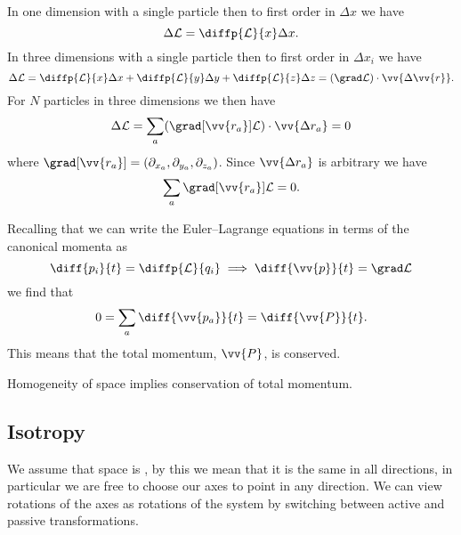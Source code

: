 \documentclass[fleqn]{NotesClass}
\newcommand*{\lagrangian}{\mathcal{L}}
\begin{document}
    In one dimension with a single particle then to first order in \(\Delta x\) we have
    \begin{equation}
        \Delta\lagrangian = \diffp{\lagrangian}{x} \Delta x.
    \end{equation}
    In three dimensions with a single particle then to first order in \(\Delta x_i\) we have
    \begin{equation}
        \Delta\lagrangian = \diffp{\lagrangian}{x} \Delta x + \diffp{\lagrangian}{y} \Delta y + \diffp{\lagrangian}{z} \Delta z = (\grad \lagrangian) \cdot \vv{\Delta\vv{r}}.
    \end{equation}
    For \(N\) particles in three dimensions we then have
    \begin{equation}
        \Delta\lagrangian = \sum_a (\grad[\vv{r_a}] \lagrangian) \cdot \vv{\Delta r_a} = 0
    \end{equation}
    where \(\grad[\vv{r_a}] = (\partial_{x_a}, \partial_{y_a}, \partial_{z_a})\).
    Since \(\vv{\Delta r_a}\) is arbitrary we have
    \begin{equation}
        \sum_a \grad[\vv{r_a}]\lagrangian = 0.
    \end{equation}
    
    Recalling that we can write the Euler--Lagrange equations in terms of the canonical momenta as
    \begin{equation}
        \diff{p_i}{t} = \diffp{\lagrangian}{q_i} \implies \diff{\vv{p}}{t} = \grad \lagrangian
    \end{equation}
    we find that
    \begin{equation}
        0 = \sum_{a} \diff{\vv{p_a}}{t} = \diff{\vv{P}}{t}.
    \end{equation}
    This means that the total momentum, \(\vv{P}\), is conserved.
    \begin{important}
        Homogeneity of space implies conservation of total momentum.
    \end{important}

    \subsection{Isotropy}    
    We assume that space is , by this we mean that it is the same in all directions, in particular we are free to choose our axes to point in any direction.
    We can view rotations of the axes as rotations of the system by switching between active and passive transformations.
    
\end{document}
